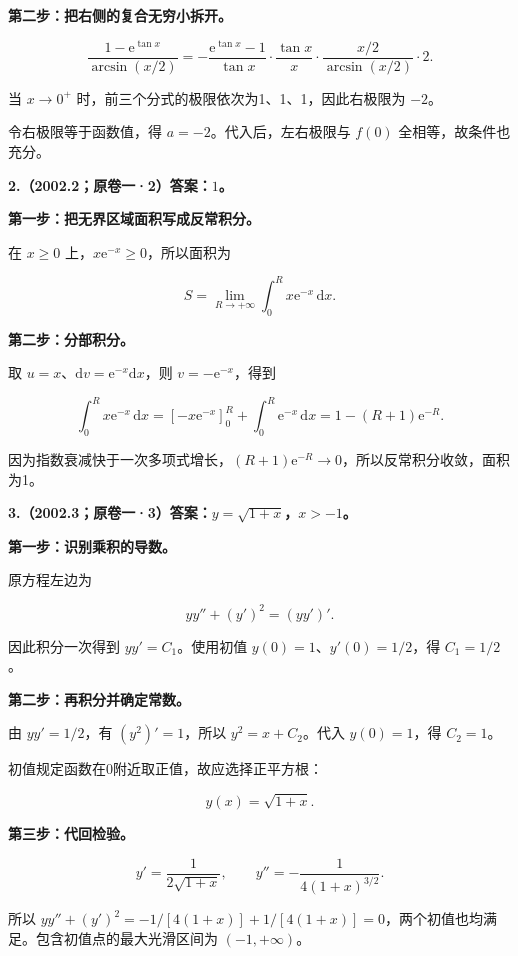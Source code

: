 \documentclass[UTF8,11pt,fontset=windows]{ctexart}
\begin{document}
\textbf{第二步：把右侧的复合无穷小拆开。}

$$
\frac{1-\mathrm e^{\tan x}}{\arcsin(x/2)}
=-\frac{\mathrm e^{\tan x}-1}{\tan x}
\cdot\frac{\tan x}{x}
\cdot\frac{x/2}{\arcsin(x/2)}\cdot2.
$$

当 $x\to0^+$ 时，前三个分式的极限依次为1、1、1，因此右极限为 $-2$。

令右极限等于函数值，得 $a=-2$。代入后，左右极限与 $f(0)$ 全相等，故条件也充分。

\clearpage

\textbf{2.（2002.2；原卷一·2）答案：$1$。}

\textbf{第一步：把无界区域面积写成反常积分。}

在 $x\ge0$ 上，$x\mathrm e^{-x}\ge0$，所以面积为

$$
S=\lim_{R\to+\infty}\int_0^R x\mathrm e^{-x}\,\mathrm dx.
$$

\textbf{第二步：分部积分。}

取 $u=x$、$\mathrm dv=\mathrm e^{-x}\mathrm dx$，则 $v=-\mathrm e^{-x}$，得到

$$
\int_0^R x\mathrm e^{-x}\,\mathrm dx
=[-x\mathrm e^{-x}]_0^R+\int_0^R\mathrm e^{-x}\,\mathrm dx
=1-(R+1)\mathrm e^{-R}.
$$

因为指数衰减快于一次多项式增长，$(R+1)\mathrm e^{-R}\to0$，所以反常积分收敛，面积为1。

\clearpage

\textbf{3.（2002.3；原卷一·3）答案：$y=\sqrt{1+x}$，$x>-1$。}

\textbf{第一步：识别乘积的导数。}

原方程左边为

$$
yy''+(y')^2=(yy')'.
$$

因此积分一次得到 $yy'=C_1$。使用初值 $y(0)=1$、$y'(0)=1/2$，得 $C_1=1/2$。

\textbf{第二步：再积分并确定常数。}

由 $yy'=1/2$，有 $(y^2)'=1$，所以 $y^2=x+C_2$。代入 $y(0)=1$，得 $C_2=1$。

初值规定函数在0附近取正值，故应选择正平方根：

$$
y(x)=\sqrt{1+x}.
$$

\textbf{第三步：代回检验。}

$$
y'=\frac1{2\sqrt{1+x}},\qquad
 y''=-\frac1{4(1+x)^{3/2}}.
$$

所以 $yy''+(y')^2=-1/[4(1+x)]+1/[4(1+x)]=0$，两个初值也均满足。包含初值点的最大光滑区间为 $(-1,+\infty)$。
\end{document}
